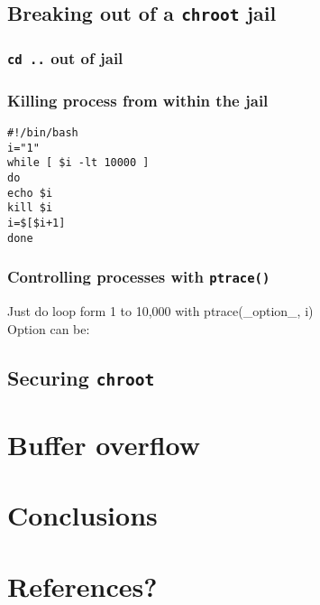 \documentclass[12pt, a4paper, pdflatex]{article}
\begin{document}
\subsection{Breaking out of a \texttt{chroot} jail}
\subsubsection{\texttt{cd ..} out of jail}

\subsubsection{Killing process from within the jail}
\vspace{1em}
\lstset{
  captionpos=b,
  frame=single,
  language=bash,
  breaklines=true,
  caption=Kill processes outside of chroot jail.,
  label=chroot:kill
}
\begin{lstlisting}
#!/bin/bash
i="1"
while [ $i -lt 10000 ]
do
echo $i
kill $i
i=$[$i+1]
done
\end{lstlisting}

\subsubsection{Controlling processes with \texttt{ptrace()}}
Just do loop form 1 to 10,000 with ptrace(\_option\_, i)\\
Option can be: 

\subsection{Securing \texttt{chroot}}

\section{Buffer overflow}
\lipsum[3]

\section{Conclusions}

\section{References?}
\end{document}
